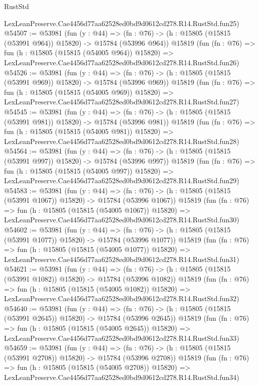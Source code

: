 \begin{lexlean}{RustStd}
\begin{coremodule}
    LexLeanPreserve.Cae4456d77aa62528ed0bd9d0612cd278.R14.RustStd.fun25)
@54507 := @53981
    (fun (y : @44) =>
    (fn : @76) -> (h : @15805 (@15815 (@53991 @964)) @15820) -> @15784 (@53996 @964))
    @15819
    (fun (fn : @76) =>
    fun (h : @15805 (@15815 (@54005 @964)) @15820) =>
    LexLeanPreserve.Cae4456d77aa62528ed0bd9d0612cd278.R14.RustStd.fun26)
@54526 := @53981
    (fun (y : @44) =>
    (fn : @76) -> (h : @15805 (@15815 (@53991 @969)) @15820) -> @15784 (@53996 @969))
    @15819
    (fun (fn : @76) =>
    fun (h : @15805 (@15815 (@54005 @969)) @15820) =>
    LexLeanPreserve.Cae4456d77aa62528ed0bd9d0612cd278.R14.RustStd.fun27)
@54545 := @53981
    (fun (y : @44) =>
    (fn : @76) -> (h : @15805 (@15815 (@53991 @981)) @15820) -> @15784 (@53996 @981))
    @15819
    (fun (fn : @76) =>
    fun (h : @15805 (@15815 (@54005 @981)) @15820) =>
    LexLeanPreserve.Cae4456d77aa62528ed0bd9d0612cd278.R14.RustStd.fun28)
@54564 := @53981
    (fun (y : @44) =>
    (fn : @76) -> (h : @15805 (@15815 (@53991 @997)) @15820) -> @15784 (@53996 @997))
    @15819
    (fun (fn : @76) =>
    fun (h : @15805 (@15815 (@54005 @997)) @15820) =>
    LexLeanPreserve.Cae4456d77aa62528ed0bd9d0612cd278.R14.RustStd.fun29)
@54583 := @53981
    (fun (y : @44) =>
    (fn : @76) -> (h : @15805 (@15815 (@53991 @1067)) @15820) -> @15784 (@53996 @1067))
    @15819
    (fun (fn : @76) =>
    fun (h : @15805 (@15815 (@54005 @1067)) @15820) =>
    LexLeanPreserve.Cae4456d77aa62528ed0bd9d0612cd278.R14.RustStd.fun30)
@54602 := @53981
    (fun (y : @44) =>
    (fn : @76) -> (h : @15805 (@15815 (@53991 @1077)) @15820) -> @15784 (@53996 @1077))
    @15819
    (fun (fn : @76) =>
    fun (h : @15805 (@15815 (@54005 @1077)) @15820) =>
    LexLeanPreserve.Cae4456d77aa62528ed0bd9d0612cd278.R14.RustStd.fun31)
@54621 := @53981
    (fun (y : @44) =>
    (fn : @76) -> (h : @15805 (@15815 (@53991 @1082)) @15820) -> @15784 (@53996 @1082))
    @15819
    (fun (fn : @76) =>
    fun (h : @15805 (@15815 (@54005 @1082)) @15820) =>
    LexLeanPreserve.Cae4456d77aa62528ed0bd9d0612cd278.R14.RustStd.fun32)
@54640 := @53981
    (fun (y : @44) =>
    (fn : @76) -> (h : @15805 (@15815 (@53991 @2645)) @15820) -> @15784 (@53996 @2645))
    @15819
    (fun (fn : @76) =>
    fun (h : @15805 (@15815 (@54005 @2645)) @15820) =>
    LexLeanPreserve.Cae4456d77aa62528ed0bd9d0612cd278.R14.RustStd.fun33)
@54659 := @53981
    (fun (y : @44) =>
    (fn : @76) -> (h : @15805 (@15815 (@53991 @2708)) @15820) -> @15784 (@53996 @2708))
    @15819
    (fun (fn : @76) =>
    fun (h : @15805 (@15815 (@54005 @2708)) @15820) =>
    LexLeanPreserve.Cae4456d77aa62528ed0bd9d0612cd278.R14.RustStd.fun34)

\end{coremodule}
\end{lexlean}
